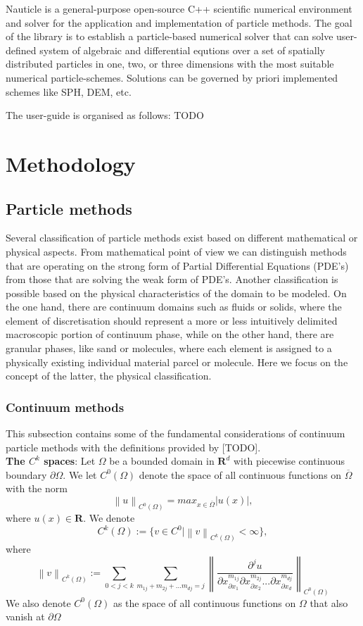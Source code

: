 \documentclass[a4paper,12pt,openany]{book}
\newcommand*{\SET}[1]  {\ensuremath{\mathbf{#1}}}
\newcommand{\R}{\SET{R}}
\newcommand{\norm}[1]{\left\lVert#1\right\rVert}
\theoremstyle{break}
\begin{document}
Nauticle is a general-purpose open-source C++ scientific numerical environment and solver for the application and implementation of particle methods. The goal of the library is to  establish a particle-based numerical solver that can solve user-defined system of algebraic and differential equtions over a set of spatially distributed particles in one, two, or three dimensions with the most suitable numerical particle-schemes. Solutions can be governed by priori implemented schemes like SPH, DEM, etc. 

The user-guide is organised as follows: TODO

\section{Methodology}
\subsection{Particle methods} \label{sec:particle_method_classification}
Several classification of particle methods exist based on different mathematical or physical aspects. From mathematical point of view we can distinguish methods that are operating on the strong form of Partial Differential Equations (PDE's) from those that are solving the weak form of PDE's. Another classification is possible based on the physical characteristics of the domain to be modeled. On the one hand, there are continuum domains such as fluids or solids, where the element of discretisation should represent a more or less intuitively delimited macroscopic portion of continuum phase, while on the other hand, there are granular phases, like sand or molecules, where each element is assigned to a physically existing individual material parcel or molecule. Here we focus on the concept of the latter, the physical classification.
\subsubsection{Continuum methods}
This subsection contains some of the fundamental considerations of continuum particle methods with the definitions provided by [TODO]. \\

\textbf{The $C^k$ spaces}: Let $\Omega$ be a bounded domain in $\R^d$ with piecewise continuous boundary $\partial\Omega$. We let $C^0(\Omega)$ denote the space of all continuous functions on $\overline{\Omega}$ with the norm
\begin{equation}
\norm{u}_{C^0(\Omega)}=max_{x\in\overline{\Omega}}|u(x)|,
\end{equation}
where $u(x)\in\R$. We denote
\begin{equation}
C^k(\Omega):=\{v\in C^0\vert\norm{v}_{C^k (\Omega)}<\infty\},
\end{equation}
where
\begin{equation}
\norm{v}_{C^k (\Omega)}:=\sum_{0<j<k}\sum_{m_{1j}+m_{2j}+...m_{dj}=j}\norm{\frac{\partial^j u}{\partial x^{m_{1j}}_{\partial x_1}\partial x^{m_{2j}}_{\partial x_2}...\partial x^{m_{dj}}_{\partial x_d}}}_{C^0(\Omega)}
\end{equation}
We also denote $C^0(\Omega)$ as the space of all continuous functions on $\Omega$ that also vanish at $\partial\Omega$
\end{document}
